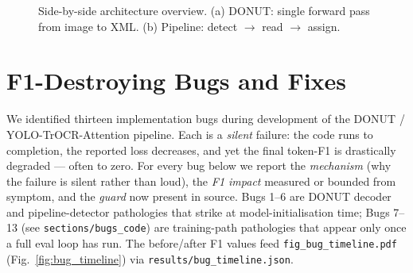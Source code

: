 \documentclass[conference]{IEEEtran}
\begin{document}
\begin{figure}[t]
\centering
{}
\caption{Side-by-side architecture overview. (a) DONUT: single forward
pass from image to XML. (b) Pipeline: detect $\to$ read $\to$ assign.}
\label{fig:pipelines}
\end{figure}

\section{F1-Destroying Bugs and Fixes}
\label{sec:bugs}

We identified thirteen implementation bugs during development of the
DONUT / YOLO-TrOCR-Attention pipeline.  Each is a \emph{silent}
failure: the code runs to completion, the reported loss decreases,
and yet the final token-F1 is drastically degraded --- often to
zero.  For every bug below we report the \emph{mechanism} (why the
failure is silent rather than loud), the \emph{F1 impact} measured
or bounded from symptom, and the \emph{guard} now present in source.
Bugs 1--6 are DONUT decoder and pipeline-detector pathologies that
strike at model-initialisation time; Bugs 7--13 (see
\texttt{sections/bugs\_code}) are training-path pathologies that
appear only once a full eval loop has run.  The before/after F1
values feed \texttt{fig\_bug\_timeline.pdf}
(Fig.~\ref{fig:bug_timeline}) via
\texttt{results/bug\_timeline.json}.
\end{document}
